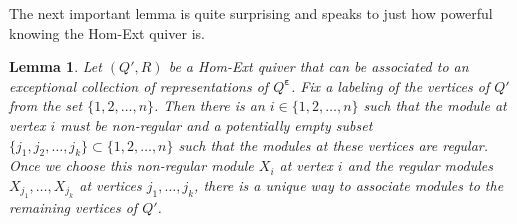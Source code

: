 \documentclass[12pt]{amsart}
\theoremstyle{plain}
\newtheorem{lem}[thm]{Lemma}
\theoremstyle{definition}
\theoremstyle{remark}
\begin{document}
The next important lemma is quite surprising and speaks to just how powerful knowing the Hom-Ext quiver is.

\begin{lem} \label{lem: Hom-Ext quiver is uniquely determined by one non-regular} 
Let {\color{black}$(Q',R)$} be a Hom-Ext quiver that can be associated to an exceptional collection of {\color{black} representations of} $Q^{\bm{\varepsilon}}$. Fix a labeling of the vertices of $Q'$ from the set $\{1,2,\dots, n\}$. Then there is an $i \in \{1,2,\dots, n\}$ such that the module at vertex $i$ must be non-regular {\color{black} and a potentially empty subset $\{j_1, j_2, \dots, j_k\}\subset \{1,2,\dots, n\}$ such that the modules at these vertices are regular.} Once we choose this non-regular module $X_i$ at vertex $i$ {\color{black} and the regular modules $X_{j_1}, \dots, X_{j_k}$ at vertices $j_1, \dots, j_k$,} there is a unique way to associate modules to the remaining vertices of $Q'$.
\end{lem}
\end{document}
